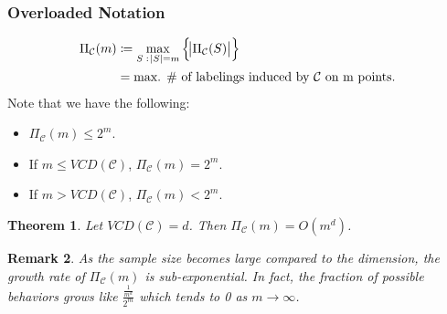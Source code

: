 \documentclass[12pt, letterpaper]{article}
\numberwithin{equation}{section} %
\newcommand{\mc}{\mathcal}
\newtheorem{theorem}{Theorem}[section]
\newtheorem{remark}[theorem]{Remark}
\theoremstyle{definition}
\theoremstyle{remark}
\begin{document}
\subsubsection*{Overloaded Notation}
\begin{align}
    \Pi_{\mc C}(m) &\coloneqq \max\limits_{S\;:\;\abs{S}= m}\left\{\abs{\Pi_{\mc C}(S)}\right\}\\
    &= \textrm{max. \# of labelings induced by $\mc C$ on m points.}
\end{align}
Note that we have the following:
\begin{itemize}
    \item  $\Pi_{\mc C}(m)\leq 2^m$.
    \item If $m\leq VCD(\mc C)$, $\Pi_{\mc C}(m)=2^m$. 
    \item If  $m > VCD(\mc C)$, $\Pi_{\mc C}(m) < 2^m$.
\end{itemize} 

\begin{theorem}\label{main thm lecture 4}
    Let $VCD(\mc C)=d$. Then $\Pi_{\mc C}(m) = O(m^d)$.
\end{theorem}

\begin{remark}
    As the sample size becomes large compared to the dimension, the growth rate of $\Pi_{\mc C}(m)$ is sub-exponential. In fact, the fraction of possible behaviors grows like $\frac{\frac1{m^d}}{2^m}$ which tends to 0 as $m\to\infty$.
\end{remark}
\end{document}
